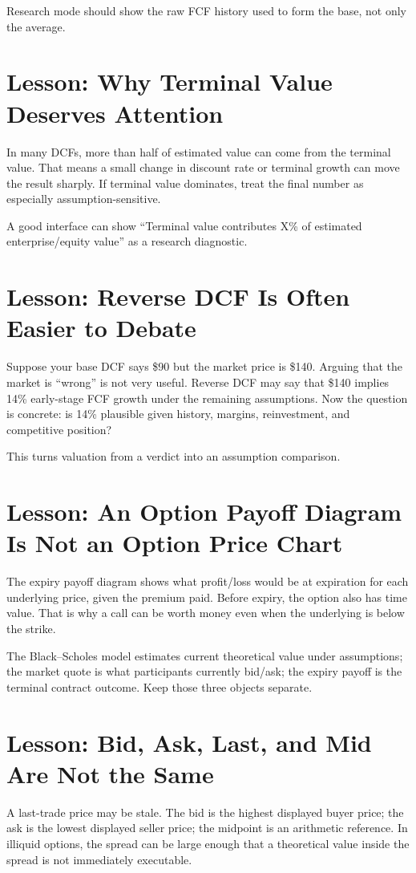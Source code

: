 \documentclass[11pt]{article}
\begin{document}
Research mode should show the raw FCF history used to form the base, not only the average.

\section{Lesson: Why Terminal Value Deserves Attention}
In many DCFs, more than half of estimated value can come from the terminal value. That means a small change in discount rate or terminal growth can move the result sharply. If terminal value dominates, treat the final number as especially assumption-sensitive.

A good interface can show ``Terminal value contributes X\% of estimated enterprise/equity value'' as a research diagnostic.

\section{Lesson: Reverse DCF Is Often Easier to Debate}
Suppose your base DCF says \$90 but the market price is \$140. Arguing that the market is ``wrong'' is not very useful. Reverse DCF may say that \$140 implies 14\% early-stage FCF growth under the remaining assumptions. Now the question is concrete: is 14\% plausible given history, margins, reinvestment, and competitive position?

This turns valuation from a verdict into an assumption comparison.

\section{Lesson: An Option Payoff Diagram Is Not an Option Price Chart}
The expiry payoff diagram shows what profit/loss would be at expiration for each underlying price, given the premium paid. Before expiry, the option also has time value. That is why a call can be worth money even when the underlying is below the strike.

The Black--Scholes model estimates current theoretical value under assumptions; the market quote is what participants currently bid/ask; the expiry payoff is the terminal contract outcome. Keep those three objects separate.

\section{Lesson: Bid, Ask, Last, and Mid Are Not the Same}
A last-trade price may be stale. The bid is the highest displayed buyer price; the ask is the lowest displayed seller price; the midpoint is an arithmetic reference. In illiquid options, the spread can be large enough that a theoretical value inside the spread is not immediately executable.
\end{document}
